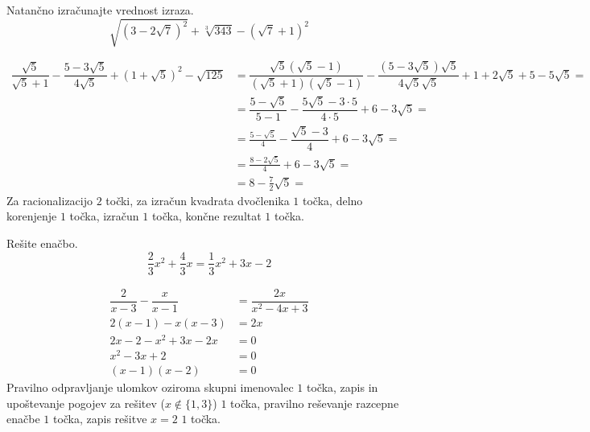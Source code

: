 \documentclass[addpoints,12pt]{exam}
\begin{document}
\begin{questions}


    \question[5]
    Natančno izračunajte vrednost izraza.
    $$ \sqrt{\left(3-2\sqrt{7}\right)^2}+\sqrt[3]{343}-\left(\sqrt{7}+1\right)^2 $$

    \begin{solution}[7cm]
        \begin{align*} 
            \dfrac{\sqrt{5}}{\sqrt{5}+1}-\dfrac{5-3\sqrt{5}}{4\sqrt{5}}+\left(1+\sqrt{5}\right)^2-\sqrt{125}&=\dfrac{\sqrt{5}(\sqrt{5}-1)}{(\sqrt{5}+1)(\sqrt{5}-1)}-\dfrac{(5-3\sqrt{5})\sqrt{5}}{4\sqrt{5}\sqrt{5}}+1+2\sqrt{5}+5-5\sqrt{5}= \\
                                                                                                            &=\dfrac{5-\sqrt{5}}{5-1}-\dfrac{5\sqrt{5}-3\cdot 5}{4\cdot 5}+6-3\sqrt{5}= \\
                                                                                                            &=\frac{5-\sqrt{5}}{4}-\dfrac{\sqrt{5}-3}{4}+6-3\sqrt{5}= \\
                                                                                                            &=\frac{8-2\sqrt{5}}{4}+6-3\sqrt{5}= \\
                                                                                                            &=8-\frac{7}{2}\sqrt{5}= 
        \end{align*}
        Za racionalizacijo $2$ točki, za izračun kvadrata dvočlenika $1$ točka, delno korenjenje $1$ točka, izračun $1$ točka, končne rezultat $1$ točka.
    \end{solution}
    
    
    \newpage

    \question[4]
    Rešite enačbo.
    $$ \frac{2}{3}x^2+\frac{4}{3}x=\frac{1}{3}x^2+3x-2 $$
    
    
    \begin{solution}[4cm]
        \begin{align*} 
            \dfrac{2}{x-3}-\dfrac{x}{x-1} &=\dfrac{2x}{x^2-4x+3} \\
            2(x-1)-x(x-3) &= 2x \\
            2x-2-x^2+3x-2x &=0 \\
            x^2-3x+2 &=0 \\
            (x-1)(x-2) &=0
        \end{align*}
        Pravilno odpravljanje ulomkov oziroma skupni imenovalec $1$ točka, zapis in upoštevanje pogojev za rešitev ($x\notin\{1,3\}$) $1$ točka, pravilno reševanje razcepne enačbe $1$ točka, zapis rešitve $x=2$ $1$ točka.
    \end{solution}


\end{questions}
\end{document}
